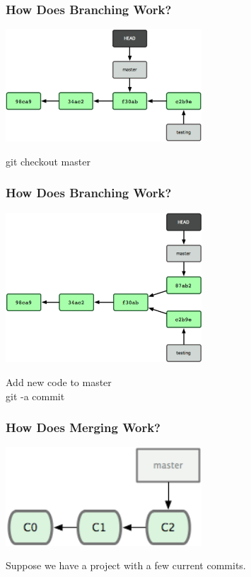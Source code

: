 \begin{frame}
\frametitle{\large How Does Branching Work?}
\begin{center}
\includegraphics[width=0.55\textwidth]{img/branching_images/fig8.png}
\end{center}
\vspace{2mm}
\begin{center}
git checkout master
\end{center}
\end{frame}
\note{}

\begin{frame}
\frametitle{\large How Does Branching Work?}
\begin{center}
\includegraphics[width=0.55\textwidth]{img/branching_images/fig9.png}
\end{center}
\vspace{2mm}
\begin{center}
\small Add new code to master\\
\small git -a commit
\end{center}
\end{frame}
\note{}

\begin{frame}
\frametitle{\large How Does Merging Work?}
\begin{center}
\includegraphics[width=0.55\textwidth]{img/branching_images/f1.png}
\end{center}
\vspace{2mm}
\begin{center}
Suppose we have a project with a few current commits.
\end{center}
\end{frame}
\note{}

